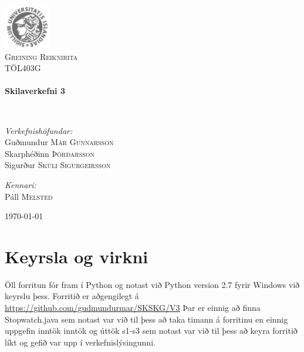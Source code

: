 \documentclass{article}
\begin{document}
\begin {titlepage}
\begin{center}
\includegraphics[width=0.15\textwidth]{./Haskoli_Islands_rett.jpg}~\\[1cm]

\textsc{\LARGE Greining Reiknirita}\\[1.5cm]

\textsc{\Large TÖL403G}\\[0.5cm]

\HRule \\[0.4cm]
{ \huge \bfseries Skilaverkefni 3\\[0.4cm] }

\HRule \\[1.5cm]

\begin{minipage}{0.5\textwidth}
\begin{flushleft} \large
\emph{Verkefnishöfundar:}
\\ Guðmundur\textsc{ Már Gunnarsson }
\\ Skarphéðinn \textsc{Þórðarsson}
\\ Sigurður \textsc{Skúli Sigurgeirsson}

\end{flushleft}
\end{minipage}
\begin{minipage}{0.4\textwidth}
\begin{flushright} \large
\emph{Kennari:} \\
Páll \textsc{Melsted}
\end{flushright}
\end{minipage}

\vfill

{\large \today}

\end{center}

\end{titlepage}

\section {Keyrsla og virkni}
Öll forritun fór fram í Python og notast við Python version 2.7 fyrir Windows við keyrslu þess. 
Forritið er aðgengilegt á \url{https://github.com/gudmundurmar/SKSKG/V3}
Þar er einnig að finna Stopwatch.java sem notast var við til þess að taka timann á forritinu en einnig uppgefin inntök inntök og úttök s1-s3 sem notast var við til þess að keyra forritið líkt og gefið var upp í verkefnislýsingunni. 
\end{document}
